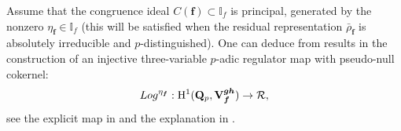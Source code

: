 \documentclass[10pt,letterpaper]{amsart}
\theoremstyle{plain}
\theoremstyle{definition}
\theoremstyle{definition}
\theoremstyle{plain}
\theoremstyle{plain}
\theoremstyle{plain}
\theoremstyle{remark}
\numberwithin{equation}{section}
\newcommand{\rH}{{\mathrm{H}}}
\newcommand{\Q}{\mathbf{Q}}
\newcommand{\cR}{\mathbb{I}}
\newcommand{\bff}{{\boldsymbol{f}}}
\newcommand{\bfg}{{\boldsymbol{g}}}
\newcommand{\bfh}{{\boldsymbol{h}}}
\begin{document}
Assume that the congruence ideal $C(\bff)\subset\cR_f$ is principal, generated by the nonzero $\eta_\bff\in\cR_f$ (this will be satisfied when the residual representation $\bar{\rho}_{\bff}$ is absolutely irreducible and $p$-distinguished). 
One can deduce from results in \cite{KLZ} the construction of an injective three-variable $p$-adic regulator map with pseudo-null cokernel:
\begin{equation}\label{eq:Log}
{\rm Log}^{\eta_\bff}
:\rH^1(\Q_p,\mathbf{V}_{\bff}^{\bfg\bfh})\rightarrow\mathcal{R},
\end{equation}
see the explicit map in \cite[\S{4.3.1}]{CD} and the explanation in \cite[\S{7.3}]{BSV}.

\end{document}
